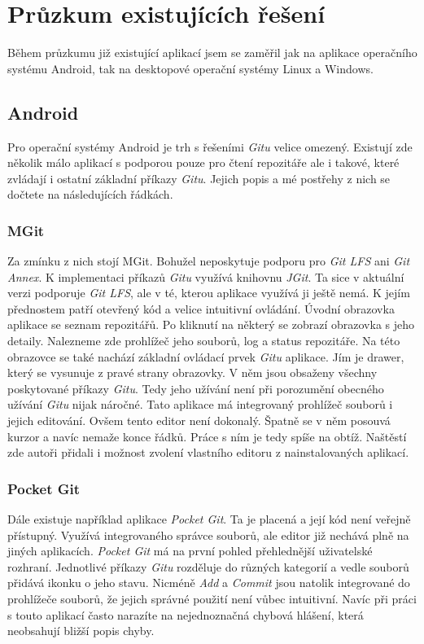 \section{Průzkum existujících řešení}
Během průzkumu již existující aplikací jsem se zaměřil jak na aplikace operačního systému Android, tak na desktopové operační systémy Linux a Windows.

    \subsection {Android}
    Pro operační systémy Android je trh s řešeními \emph{Gitu} velice omezený. Existují zde několik málo aplikací s podporou pouze pro čtení repozitáře ale i takové, které zvládají i ostatní základní příkazy \emph{Gitu}. Jejich popis a mé postřehy z nich se dočtete na následujících řádkách.

        \subsubsection{MGit~}
        Za zmínku z nich stojí MGit. Bohužel neposkytuje podporu pro \emph{Git LFS} ani \emph{Git Annex}. K implementaci příkazů \emph{Gitu} využívá knihovnu \emph{JGit}. Ta sice v aktuální verzi podporuje \emph{Git LFS}, ale v té, kterou aplikace využívá ji ještě nemá. K jejím přednostem patří otevřený kód a velice intuitivní ovládání.
        Úvodní obrazovka aplikace se seznam repozitářů. Po kliknutí na některý se zobrazí obrazovka s jeho detaily. Nalezneme zde prohlížeč jeho souborů, log a status repozitáře. Na této obrazovce se také nachází základní ovládací prvek \emph{Gitu} aplikace. Jím je drawer, který se vysunuje z pravé strany obrazovky. V něm jsou obsaženy všechny poskytované příkazy \emph{Gitu}. Tedy jeho užívání není při porozumění obecného užívání \emph{Gitu} nijak náročné. Tato aplikace má integrovaný prohlížeč souborů i jejich editování. Ovšem tento editor není dokonalý. Špatně se v něm posouvá kurzor a navíc nemaže konce řádků. Práce s ním je tedy spíše na obtíž. Naštěstí zde autoři přidali i možnost zvolení vlastního editoru z nainstalovaných aplikací.

        \subsubsection{Pocket Git~}
        Dále existuje například aplikace \emph{Pocket Git}. Ta je placená a její kód není veřejně přístupný. Využívá integrovaného správce souborů, ale editor již nechává plně na jiných aplikacích. \emph{Pocket Git} má na první pohled přehlednější uživatelské rozhraní. Jednotlivé příkazy \emph{Gitu} rozděluje do různých kategorií a vedle souborů přidává ikonku o jeho stavu. Nicméně \emph{Add} a \emph{Commit} jsou natolik integrované do prohlížeče souborů, že jejich správné použití není vůbec intuitivní. Navíc při práci s touto aplikací často narazíte na nejednoznačná chybová hlášení, která neobsahují bližší popis chyby.


